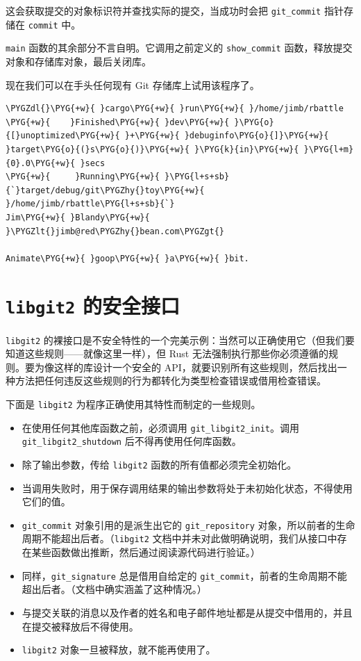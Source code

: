 这会获取提交的对象标识符并查找实际的提交，当成功时会把 \texttt{git\_commit} 指针存储在 \texttt{commit} 中。

\texttt{main} 函数的其余部分不言自明。它调用之前定义的 \texttt{show\_commit} 函数，释放提交对象和存储库对象，最后关闭库。

现在我们可以在手头任何现有 Git 存储库上试用该程序了。

\begin{Verbatim}[commandchars=\\\{\},breaklines=true,breakanywhere=true,fontsize=\codefont,xleftmargin=17bp]
\PYGZdl{}\PYG{+w}{ }cargo\PYG{+w}{ }run\PYG{+w}{ }/home/jimb/rbattle
\PYG{+w}{    }Finished\PYG{+w}{ }dev\PYG{+w}{ }\PYG{o}{[}unoptimized\PYG{+w}{ }+\PYG{+w}{ }debuginfo\PYG{o}{]}\PYG{+w}{ }target\PYG{o}{(}s\PYG{o}{)}\PYG{+w}{ }\PYG{k}{in}\PYG{+w}{ }\PYG{l+m}{0}.0\PYG{+w}{ }secs
\PYG{+w}{     }Running\PYG{+w}{ }\PYG{l+s+sb}{`}target/debug/git\PYGZhy{}toy\PYG{+w}{ }/home/jimb/rbattle\PYG{l+s+sb}{`}
Jim\PYG{+w}{ }Blandy\PYG{+w}{ }\PYGZlt{}jimb@red\PYGZhy{}bean.com\PYGZgt{}

Animate\PYG{+w}{ }goop\PYG{+w}{ }a\PYG{+w}{ }bit.
\end{Verbatim}

\section{\texttt{libgit2} 的安全接口}

\texttt{libgit2} 的裸接口是不安全特性的一个完美示例：当然可以正确使用它（但我们要知道这些规则——就像这里一样），但 Rust 无法强制执行那些你必须遵循的规则。要为像这样的库设计一个安全的 API，就要识别所有这些规则，然后找出一种方法把任何违反这些规则的行为都转化为类型检查错误或借用检查错误。

下面是 \texttt{libgit2} 为程序正确使用其特性而制定的一些规则。

\begin{itemize}
\item 在使用任何其他库函数之前，必须调用 \texttt{git\_libgit2\_init}。调用 \texttt{git\_libgit2\_shutdown} 后不得再使用任何库函数。
\item 除了输出参数，传给 \texttt{libgit2} 函数的所有值都必须完全初始化。
\item 当调用失败时，用于保存调用结果的输出参数将处于未初始化状态，不得使用它们的值。
\item \texttt{git\_commit} 对象引用的是派生出它的 \texttt{git\_repository} 对象，所以前者的生命周期不能超出后者。（\texttt{libgit2} 文档中并未对此做明确说明，我们从接口中存在某些函数做出推断，然后通过阅读源代码进行验证。）
\item 同样，\texttt{git\_signature} 总是借用自给定的 \texttt{git\_commit}，前者的生命周期不能超出后者。（文档中确实涵盖了这种情况。）
\item 与提交关联的消息以及作者的姓名和电子邮件地址都是从提交中借用的，并且在提交被释放后不得使用。
\item \texttt{libgit2} 对象一旦被释放，就不能再使用了。
\end{itemize}

